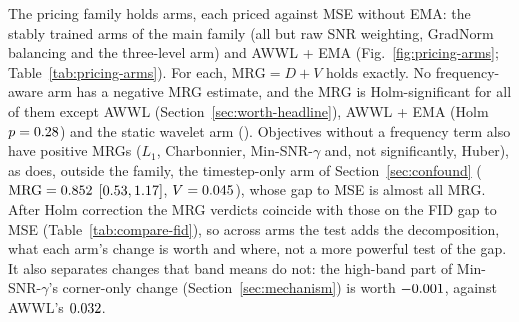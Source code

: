 The pricing family holds \nFamilyPricing{} arms, each priced against MSE
without EMA: the stably trained arms of the main family (all but raw SNR
weighting, GradNorm balancing and the three-level arm) and AWWL + EMA
(Fig.~\ref{fig:pricing-arms}; Table~\ref{tab:pricing-arms}). For each,
$\mathrm{MRG} = D + V$ holds exactly. No frequency-aware arm has a negative
MRG estimate, and the MRG is Holm-significant for all of them except AWWL
(Section~\ref{sec:worth-headline}), AWWL + EMA (Holm
$p = 0.28$) and the static wavelet arm (\mrgArmStaticHolm).
Objectives without a frequency term also have positive MRGs ($L_1$,
Charbonnier, Min-SNR-$\gamma$ and, not significantly, Huber), as does,
outside the family, the timestep-only arm of Section~\ref{sec:confound}
($\mathrm{MRG} = 0.852$ $[0.53, 1.17]$,
$V = 0.045$), whose gap to MSE is almost all MRG. After Holm
correction the MRG verdicts coincide with those on the FID gap to MSE
(Table~\ref{tab:compare-fid}), so across arms the test adds the
decomposition, what each arm's change is worth and where, not a more powerful
test of the gap. It also separates changes that band means do not: the
high-band part of Min-SNR-$\gamma$'s corner-only change
(Section~\ref{sec:mechanism}) is worth $-0.001$, against
AWWL's $0.032$.


